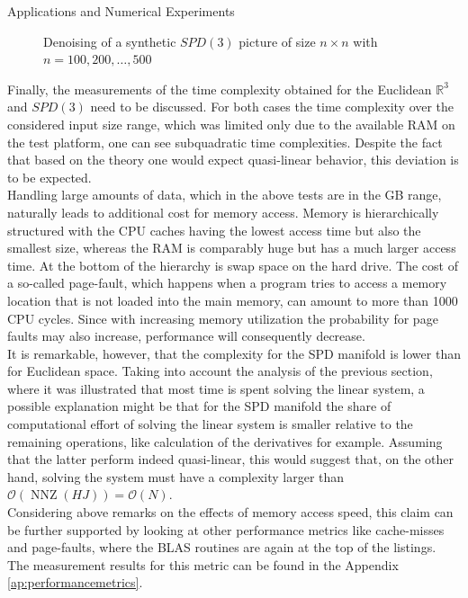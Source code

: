 \begin{chapter}{Applications and Numerical Experiments}
\begin{figure}[h!]
{	 Denoising of a synthetic $SPD(3)$ picture of size $n\times n$ with $n=100, 200, \ldots, 500$
	\label{fig:complexity}
    }
\end{figure}
Finally, the measurements of the time complexity obtained for the Euclidean $\mathbb{R}^3$ and $SPD(3)$ need to be discussed. 
For both cases the time complexity over the considered input size range, which was limited only due to the available RAM on the test platform, one can see subquadratic time complexities. Despite the fact that based on the theory one would expect
quasi-linear behavior, this deviation is to be expected.\\

Handling large amounts of data, which in the above tests are in the GB range, naturally leads to additional cost for memory access. Memory is hierarchically structured with the CPU caches having the lowest access time but also the smallest size, whereas the RAM is comparably huge but has a much larger access time. At the bottom
of the hierarchy is swap space on the hard drive. The cost of a so-called page-fault, which happens when a program tries to access
a memory location that is not loaded into the main memory, can amount to more than 1000 CPU cycles. Since with increasing memory
utilization the probability for page faults may also increase, performance will consequently decrease.\\

It is remarkable, however, that the complexity for the SPD manifold is lower than for Euclidean space. 
Taking into account the analysis of the previous section, where it was illustrated that most time is spent solving the linear system, a 
possible explanation might be that for the SPD manifold the share of computational effort of solving the linear system is smaller
relative to the remaining operations, like calculation of the derivatives for example. Assuming that the latter perform indeed
quasi-linear, this would suggest that, on the other hand, solving the system must have a complexity larger than 
$\mathcal{O}(\operatorname{NNZ}(HJ))=\mathcal{O}(N)$.\\

Considering above remarks on the effects of memory access speed, this claim can be further supported by looking at other performance metrics like
cache-misses and page-faults, where the BLAS routines are again at the top of the listings.
The measurement results for this metric can be found in the Appendix \ref{ap:performancemetrics}.



\end{chapter}
